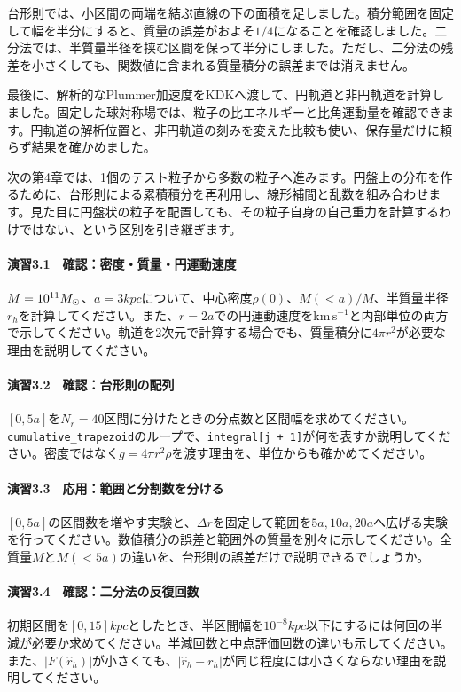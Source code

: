 台形則では、小区間の両端を結ぶ直線の下の面積を足しました。積分範囲を固定して幅を半分にすると、質量の誤差がおよそ$1/4$になることを確認しました。二分法では、半質量半径を挟む区間を保って半分にしました。ただし、二分法の残差を小さくしても、関数値に含まれる質量積分の誤差までは消えません。

最後に、解析的なPlummer加速度をKDKへ渡して、円軌道と非円軌道を計算しました。固定した球対称場では、粒子の比エネルギーと比角運動量を確認できます。円軌道の解析位置と、非円軌道の刻みを変えた比較も使い、保存量だけに頼らず結果を確かめました。

次の第4章では、1個のテスト粒子から多数の粒子へ進みます。円盤上の分布を作るために、台形則による累積積分を再利用し、線形補間と乱数を組み合わせます。見た目に円盤状の粒子を配置しても、その粒子自身の自己重力を計算するわけではない、という区別を引き継ぎます。

\chapterexercises
\paragraph{演習3.1　確認：密度・質量・円運動速度}
$M=10^{11}M_\odot$、$a=3\unit{kpc}$について、中心密度$\rho(0)$、$M(<a)/M$、半質量半径$r_h$を計算してください。また、$r=2a$での円運動速度を$\mathrm{km\,s^{-1}}$と内部単位の両方で示してください。軌道を2次元で計算する場合でも、質量積分に$4\pi r^2$が必要な理由を説明してください。

\paragraph{演習3.2　確認：台形則の配列}
$[0,5a]$を$N_r=40$区間に分けたときの分点数と区間幅を求めてください。\texttt{cumulative\_trapezoid}のループで、\texttt{integral[j + 1]}が何を表すか説明してください。密度ではなく$g=4\pi r^2\rho$を渡す理由を、単位からも確かめてください。

\paragraph{演習3.3　応用：範囲と分割数を分ける}
$[0,5a]$の区間数を増やす実験と、$\Delta r$を固定して範囲を$5a,10a,20a$へ広げる実験を行ってください。数値積分の誤差と範囲外の質量を別々に示してください。全質量$M$と$M(<5a)$の違いを、台形則の誤差だけで説明できるでしょうか。

\paragraph{演習3.4　確認：二分法の反復回数}
初期区間を$[0,15]\unit{kpc}$としたとき、半区間幅を$10^{-8}\unit{kpc}$以下にするには何回の半減が必要か求めてください。半減回数と中点評価回数の違いも示してください。また、$|F(\widehat r_h)|$が小さくても、$|\widehat r_h-r_h|$が同じ程度には小さくならない理由を説明してください。

